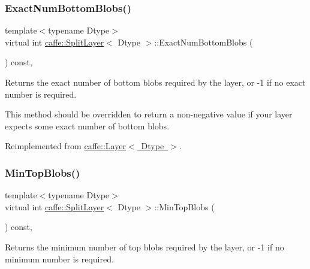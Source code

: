 \subsubsection{\texorpdfstring{Exact\+Num\+Bottom\+Blobs()}{ExactNumBottomBlobs()}\hspace{0.1cm}{\footnotesize\ttfamily [2/2]}}
{\footnotesize\ttfamily template$<$typename Dtype$>$ \\
virtual int \mbox{\hyperlink{classcaffe_1_1_split_layer}{caffe\+::\+Split\+Layer}}$<$ Dtype $>$\+::Exact\+Num\+Bottom\+Blobs (\begin{DoxyParamCaption}{ }\end{DoxyParamCaption}) const\hspace{0.3cm}{\ttfamily [inline]}, {\ttfamily [virtual]}}



Returns the exact number of bottom blobs required by the layer, or -\/1 if no exact number is required. 

This method should be overridden to return a non-\/negative value if your layer expects some exact number of bottom blobs. 

Reimplemented from \mbox{\hyperlink{classcaffe_1_1_layer_a8e5ee0494d85f5f55fc4396537cbc60f}{caffe\+::\+Layer$<$ Dtype $>$}}.

\mbox{\label{classcaffe_1_1_split_layer_a48dafac272f2f098798e3caa09afbabe}} 
\subsubsection{\texorpdfstring{Min\+Top\+Blobs()}{MinTopBlobs()}\hspace{0.1cm}{\footnotesize\ttfamily [1/2]}}
{\footnotesize\ttfamily template$<$typename Dtype$>$ \\
virtual int \mbox{\hyperlink{classcaffe_1_1_split_layer}{caffe\+::\+Split\+Layer}}$<$ Dtype $>$\+::Min\+Top\+Blobs (\begin{DoxyParamCaption}{ }\end{DoxyParamCaption}) const\hspace{0.3cm}{\ttfamily [inline]}, {\ttfamily [virtual]}}



Returns the minimum number of top blobs required by the layer, or -\/1 if no minimum number is required. 

